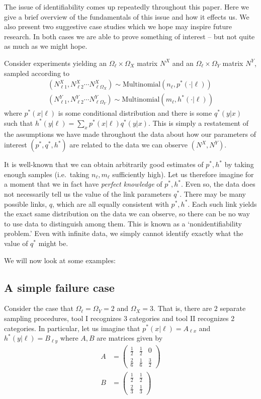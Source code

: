 The issue of identifiability comes up repeatedly throughout this paper.  Here we give a brief overview of the fundamentals of this issue and how it effects us.  We also present two suggestive case studies which we hope may inspire future research.  In both cases we are able to prove something of interest -- but not quite as much as we might hope.  

Consider experiments yielding an $\Omega_\ell\times\Omega_X$ matrix $N^X$ and an $\Omega_\ell \times \Omega_Y$ matrix $N^Y$, sampled according to
\begin{align*}
(N^X_{\ell 1},N^X_{\ell 2}\cdots N^X_{\ell \Omega_X}) \sim \mathrm{Multinomial}(n_\ell,p^*(\cdot | \ell))\\
(N^Y_{\ell 1},N^Y_{\ell 2}\cdots N^Y_{\ell \Omega_Y}) \sim \mathrm{Multinomial}(m_\ell,h^*(\cdot | \ell))
\end{align*}
where $p^*(x|\ell)$ is some conditional distribution and there is some $q^*(y|x)$ such that $h^*(y|\ell)=\sum_x p^*(x|\ell)q^*(y|x)$.  This is simply a restatement of the assumptions we have made throughout the data about how our parameters of interest $(p^*,q^*,h^*)$ are related to the data we can observe $(N^X,N^Y)$.

It is well-known that we can obtain arbitrarily good estimates of $p^*,h^*$ by taking enough samples (i.e.\ taking $n_\ell,m_\ell$ sufficiently high).  Let us therefore imagine for a moment that we in fact have \emph{perfect knowledge} of $p^*,h^*$.  Even so, the data does not necessarily tell us the value of the link parameters $q^*$.  There may be many possible links, $q$, which are all equally consistent with $p^*,h^*$.  Each such link yields the exact same distribution on the data we can observe, so there can be no way to use data to distinguish among them.  This is known as a `nonidentifiability problem.'  Even with infinite data, we simply cannot identify exactly what the value of $q^*$ might be.

We will now look at some examples:

\subsection{A simple failure case}

Consider the case that $\Omega_\ell = \Omega_Y = 2$ and $\Omega_X=3$.  That is, there are $2$ separate sampling procedures, tool I recognizes 3 categories and tool II recognizes 2 categories.  In particular, let us imagine that $p^*(x|\ell)=A_{\ell x}$ and $h^*(y|\ell)=B_{\ell y}$ where $A,B$ are matrices given by 
%
\begin{align*}
A&=\left(\begin{array}{ccc}
\frac{1}{2} & \frac{1}{2} & 0\\
\frac{2}{6} & \frac{1}{6} & \frac{3}{2}
\end{array}\right) \\
B&=\left(\begin{array}{cc}
\frac{1}{2} & \frac{1}{2}\\
\frac{2}{3} & \frac{1}{3}
\end{array}\right)
\end{align*}

